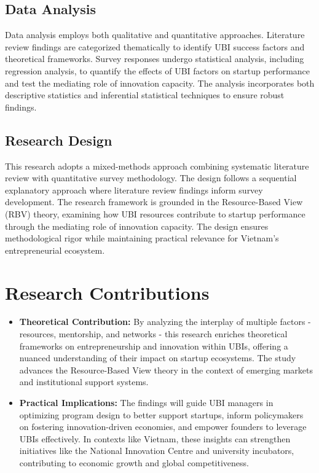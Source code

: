 \documentclass[../Main.tex]{subfiles}
\begin{document}
	\subsection{Data Analysis}
	\label{subsection:1.5.2_Data_analysis}
	Data analysis employs both qualitative and quantitative approaches. Literature review findings are categorized thematically to identify UBI success factors and theoretical frameworks. Survey responses undergo statistical analysis, including regression analysis, to quantify the effects of UBI factors on startup performance and test the mediating role of innovation capacity. The analysis incorporates both descriptive statistics and inferential statistical techniques to ensure robust findings.

	\subsection{Research Design}
	\label{subsection:1.5.3_Research_design}
	This research adopts a mixed-methods approach combining systematic literature review with quantitative survey methodology. The design follows a sequential explanatory approach where literature review findings inform survey development. The research framework is grounded in the Resource-Based View (RBV) theory, examining how UBI resources contribute to startup performance through the mediating role of innovation capacity. The design ensures methodological rigor while maintaining practical relevance for Vietnam's entrepreneurial ecosystem.

	\section{Research Contributions}
	\label{section:1.6_Research_contributions}
	\begin{itemize}
		\item \textbf{Theoretical Contribution:} By analyzing the interplay of multiple factors - resources, mentorship, and networks - this research enriches theoretical frameworks on entrepreneurship and innovation within UBIs, offering a nuanced understanding of their impact on startup ecosystems. The study advances the Resource-Based View theory in the context of emerging markets and institutional support systems.
		\item \textbf{Practical Implications:} The findings will guide UBI managers in optimizing program design to better support startups, inform policymakers on fostering innovation-driven economies, and empower founders to leverage UBIs effectively. In contexts like Vietnam, these insights can strengthen initiatives like the National Innovation Centre and university incubators, contributing to economic growth and global competitiveness.
	\end{itemize}
\end{document}
